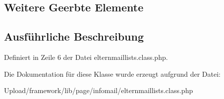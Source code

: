 \subsection*{Weitere Geerbte Elemente}


\subsection{Ausführliche Beschreibung}


Definiert in Zeile 6 der Datei elternmaillists.\+class.\+php.



Die Dokumentation für diese Klasse wurde erzeugt aufgrund der Datei\+:\begin{DoxyCompactItemize}
\item 
Upload/framework/lib/page/infomail/elternmaillists.\+class.\+php\end{DoxyCompactItemize}
